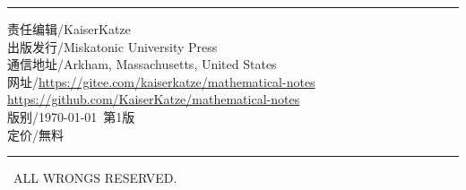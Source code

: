 \begin{titlepage}
\begingroup
\def\MyRule{\raggedright\rule{12cm}{1pt}\vspace{5pt}}
\def\LinkURL#1{\hyperref[#1]{#1}}
\MyRule

\raggedright\noindent%
责任编辑/KaiserKatze \\
出版发行/Miskatonic University Press \\
通信地址/Arkham, Massachusetts, United States \\
网\hspace{2em}址/\LinkURL{https://gitee.com/kaiserkatze/mathematical-notes} \\
\hspace{4em}\newlength{\slashlength}\settowidth{\slashlength}{/}\hspace{\slashlength}%
\LinkURL{https://github.com/KaiserKatze/mathematical-notes} \\
版\hspace{2em}别/\today\ 第1版 \\
定\hspace{2em}价/無料 \\
\MyRule

\textcopyleft\ ALL WRONGS RESERVED.
\endgroup

\end{titlepage}
